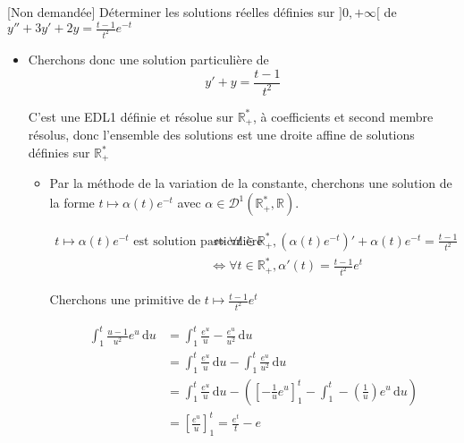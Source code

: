 \documentclass{article}
\renewenvironment{question_kholle}[2][ ]
{
	\subsection{\texorpdfstring{#2}{}}
	\notblank{#1}
	{
		\noindent #1
		\bigbreak
	}
	{}
	\begin{proof}
}
{
	\end{proof}
}
\begin{document}
\begin{question_kholle}[]{[Non demandée] Déterminer les solutions réelles définies sur $]0, + \infty [$ de $y'' + 3y' +2y = \frac{t-1}{t^{2}}e^{ -t }$}
\begin{itemize}[label=$\star$]
		      \begin{itemize}[label=$\lozenge$]
			      \item Cherchons donc une solution particulière de
			            $$
				            y' + y = \frac{t-1}{t^{2}}
			            $$

			            C'est une EDL1 définie et résolue sur $\mathbb{R}_{+}^{*}$, à coefficients et second membre résolus, donc l'ensemble des solutions est une droite affine de solutions définies sur $\mathbb{R}_{+}^{*}$

			            \begin{itemize}[label=$\triangle$]
				            \item Par la méthode de la variation de la constante, cherchons une solution de la forme $t \mapsto \alpha (t) e^{ -t }$ avec $\alpha \in \mathcal{D}^{1}(\mathbb{R}_{+}^{*}, \mathbb{R})$.


				                  \begin{align*}
					                  t \mapsto \alpha(t)e^{ -t } \text{ est solution particulière } & \iff \forall t \in \mathbb{R}_{+}^{*}, (\alpha(t)e^{ -t })' + \alpha(t)e^{ -t }= \frac{t-1}{t^{2}} \\
					                                                                                 & \iff \forall t \in \mathbb{R}_{+}^{*}, \alpha'(t) = \frac{t-1}{t^{2}}e^{ t }
				                  \end{align*}


				                  Cherchons une primitive de $t \mapsto \frac{t-1}{t^{2}}e^{ t }$


				                  \begin{align*}
					                  \int_{1}^{t} \frac{u-1}{u^{2}}e^{ u } \, \mathrm du & = \int_{1}^{t} \frac{e^{ u }}{u} - \frac{e^{ u }}{u^{2}} \, \mathrm du                                                                                                         \\
					                                                                      & = \int_{1}^{t} \frac{e^{ u }}{u} \, \mathrm du - \int_{1}^{t} \frac{e^{ u }}{u^{2}} \, \mathrm du                                                                              \\
					                                                                      & = \int_{1}^{t} \frac{e^{ u }}{u} \, \mathrm du  - \left( \left[ -\frac{1}{u}e^{ u } \right] _{1}^{t} - \int_{1}^{t} -\left( \frac{1}{u} \right) e^{ u } \, \mathrm du  \right) \\
					                                                                      & = \left[ \frac{e^{ u }}{u} \right] _{1}^{t} = \frac{e^{t}}{t} - e
				                  \end{align*}



\end{itemize}
\end{itemize}
\end{itemize}
\end{question_kholle}
\end{document}
